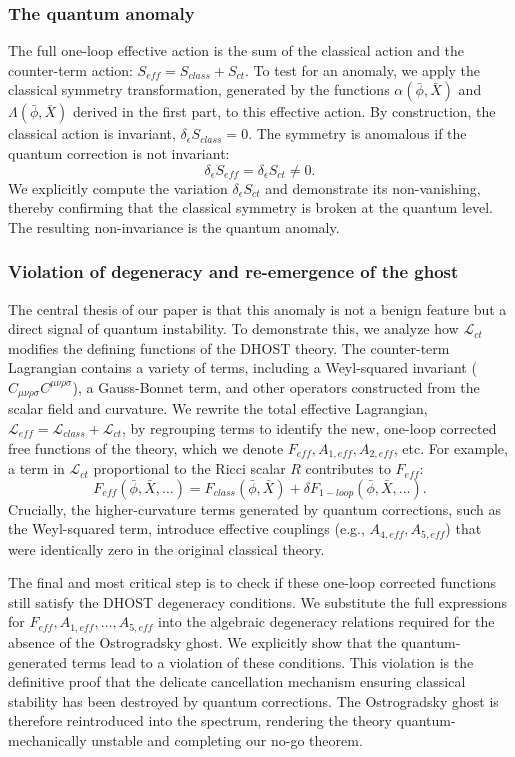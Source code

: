 \documentclass[twocolumn]{aastex631}
\begin{document}
\subsubsection{The quantum anomaly}
The full one-loop effective action is the sum of the classical action and the counter-term action: $S_{eff} = S_{class} + S_{ct}$. To test for an anomaly, we apply the classical symmetry transformation, generated by the functions $\alpha(\bar{\phi}, \bar{X})$ and $\Lambda(\bar{\phi}, \bar{X})$ derived in the first part, to this effective action. By construction, the classical action is invariant, $\delta_\epsilon S_{class} = 0$. The symmetry is anomalous if the quantum correction is not invariant:
\begin{equation}
    \delta_\epsilon S_{eff} = \delta_\epsilon S_{ct} \neq 0.
\end{equation}
We explicitly compute the variation $\delta_\epsilon S_{ct}$ and demonstrate its non-vanishing, thereby confirming that the classical symmetry is broken at the quantum level. The resulting non-invariance is the quantum anomaly.

\subsubsection{Violation of degeneracy and re-emergence of the ghost}
The central thesis of our paper is that this anomaly is not a benign feature but a direct signal of quantum instability. To demonstrate this, we analyze how $\mathcal{L}_{ct}$ modifies the defining functions of the DHOST theory. The counter-term Lagrangian contains a variety of terms, including a Weyl-squared invariant ($C_{\mu\nu\rho\sigma}C^{\mu\nu\rho\sigma}$), a Gauss-Bonnet term, and other operators constructed from the scalar field and curvature. We rewrite the total effective Lagrangian, $\mathcal{L}_{eff} = \mathcal{L}_{class} + \mathcal{L}_{ct}$, by regrouping terms to identify the new, one-loop corrected free functions of the theory, which we denote $F_{eff}, A_{1,eff}, A_{2,eff}$, etc. For example, a term in $\mathcal{L}_{ct}$ proportional to the Ricci scalar $R$ contributes to $F_{eff}$:
\begin{equation}
    F_{eff}(\bar{\phi}, \bar{X}, \dots) = F_{class}(\bar{\phi}, \bar{X}) + \delta F_{1-loop}(\bar{\phi}, \bar{X}, \dots).
\end{equation}
Crucially, the higher-curvature terms generated by quantum corrections, such as the Weyl-squared term, introduce effective couplings (e.g., $A_{4,eff}, A_{5,eff}$) that were identically zero in the original classical theory.

The final and most critical step is to check if these one-loop corrected functions still satisfy the DHOST degeneracy conditions. We substitute the full expressions for $F_{eff}, A_{1,eff}, \dots, A_{5,eff}$ into the algebraic degeneracy relations required for the absence of the Ostrogradsky ghost. We explicitly show that the quantum-generated terms lead to a violation of these conditions. This violation is the definitive proof that the delicate cancellation mechanism ensuring classical stability has been destroyed by quantum corrections. The Ostrogradsky ghost is therefore reintroduced into the spectrum, rendering the theory quantum-mechanically unstable and completing our no-go theorem.
\end{document}
